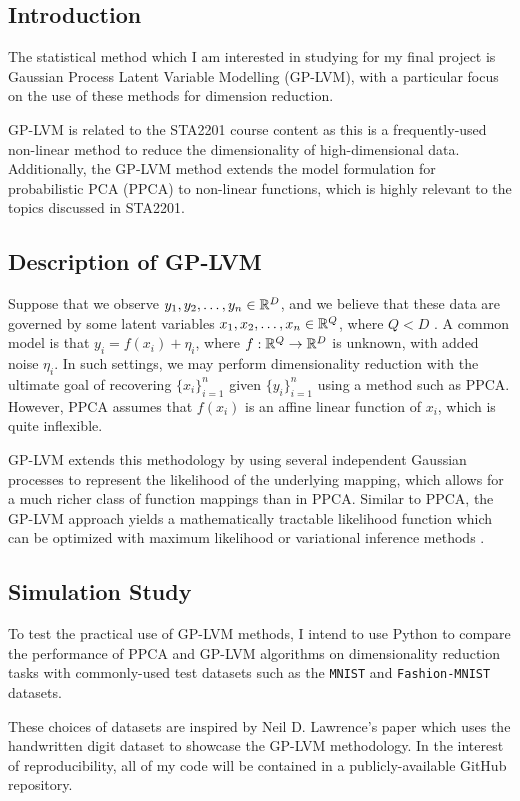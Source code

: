 \documentclass[12pt]{article}
\begin{document}
\subsection*{Introduction}
The statistical method which I am interested in studying for my final project is Gaussian Process Latent Variable Modelling (GP-LVM), with a particular focus on the use of these methods for dimension reduction. 

GP-LVM is related to the STA2201 course content as this is a frequently-used non-linear method to reduce the dimensionality of high-dimensional data. Additionally, the GP-LVM method extends the model formulation for probabilistic PCA (PPCA) to non-linear functions, which is highly relevant to the topics discussed in STA2201.

\subsection*{Description of GP-LVM}
Suppose that we observe $y_{1}, y_{2}, \dots, y_{n} \in \mathbb{R}^{D}$, and we believe that these data are governed by some latent variables $x_{1}, x_{2}, \dots, x_{n} \in \mathbb{R}^{Q}$, where $Q < D$ \cite{GPLVM-2005}. A common model is that $y_{i} = f(x_{i}) + \eta_{i}$, where $f: \mathbb{R}^{Q} \to \mathbb{R}^{D}$ is unknown, with added noise $\eta_{i}$. In such settings, we may perform dimensionality reduction with the ultimate goal of recovering $\{x_{i}\}_{i=1}^{n}$ given $\{y_{i}\}_{i=1}^{n}$ \cite{PPCA-1999,GPLVM-Viz-2004} using a method such as PPCA. However, PPCA assumes that $f(x_{i})$ is an affine linear function of $x_{i}$, which is quite inflexible.

GP-LVM extends this methodology by using several independent Gaussian processes to represent the likelihood of the underlying mapping, which allows for a much richer class of function mappings \cite{Rasmussen-GPML-2006,Bayes-GPLVM-2010} than in PPCA. Similar to PPCA, the GP-LVM approach yields a mathematically tractable likelihood function which can be optimized with maximum likelihood \cite{GPLVM-2005} or variational inference methods \cite{Bayes-GPLVM-2010,Generalized-GPLVM-2022}.

\subsection*{Simulation Study}
To test the practical use of GP-LVM methods, I intend to use Python to compare the performance of PPCA and GP-LVM algorithms on dimensionality reduction tasks with commonly-used test datasets such as the \texttt{MNIST} and \texttt{Fashion-MNIST} datasets. 

These choices of datasets are inspired by Neil D. Lawrence's paper \cite{GPLVM-2005} which uses the handwritten digit dataset to showcase the GP-LVM methodology. In the interest of reproducibility, all of my code will be contained in a publicly-available GitHub repository.

\clearpage

\nocite{*}

\end{document}
